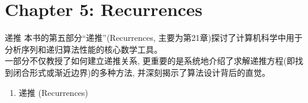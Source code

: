 \documentclass[12pt, a4paper, UTF8]{ctexart}
\begin{document}
\begin{sloppypar}
    \section{Chapter 5: Recurrences}
    \begin{chaptersummary}{递推}
        本书的第五部分“递推”(Recurrences, 主要为第21章)探讨了计算机科学中用于分析序列和递归算法性能的核心数学工具。\\
        一部分不仅教授了如何建立递推关系, 更重要的是系统地介绍了求解递推方程(即找到闭合形式或渐近边界)的多种方法, 并深刻揭示了算法设计背后的直觉。
        \tcbline %
        \begin{enumerate}[nosep]
            \item 递推 (Recurrences)
        \end{enumerate}
    \end{chaptersummary}


\end{sloppypar}
\end{document}
